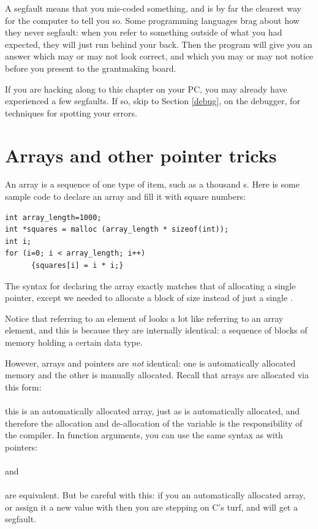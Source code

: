 \documentclass[12pt]{article}
\begin{document}
A segfault means that you mis-coded something, and 
is by far the clearest way for the computer to tell you so. Some
programming languages
brag about how they never segfault: when you refer to something
outside of what you had expected, they will just
run  behind your
back. Then the program will give you an answer which may or may not look
correct, and which you may or may not notice before you present to the
grantmaking board. 

If you are hacking along to this chapter on your PC, you may already
have experienced a few segfaults. If so, skip to 
Section \ref{debug}, on the debugger, for techniques for spotting your
errors.

\section{Arrays and other pointer tricks} \label{for_loops} 
An array is a sequence of one type of item, such as a thousand s. Here is some sample code to declare an array and fill it with square numbers:
\begin{lstlisting}
int array_length=1000;
int *squares = malloc (array_length * sizeof(int));
int i;
for (i=0; i < array_length; i++)
      {squares[i] = i * i;}
\end{lstlisting}

The syntax for declaring the array exactly match\-es that of allocating
a single pointer, except we need\-ed to allocate a block of size 
 instead of just a single . 

Notice that referring to an element of  looks a lot
like referring to an array element, and this is because they are
internally identical: a sequence of blocks of memory holding a certain
data type. 

However, arrays and pointers are {\em not} identical: one is
automatically allocated memory and the other is manually allocated.
Recall that arrays are allocated via this form:\\
\\
this is an automatically allocated array, just
as  is automatically allocated, and therefore
the allocation and de-allocation of the variable is the responsibility
of the compiler.  In function arguments, you can use the same
syntax as with pointers: 
\\ \\
and
\\ \\
are equivalent.
But be careful with this: if you  an automatically allocated
array, or assign it a new value with  then you are stepping
on C's turf, and will get a segfault.
\end{document}
